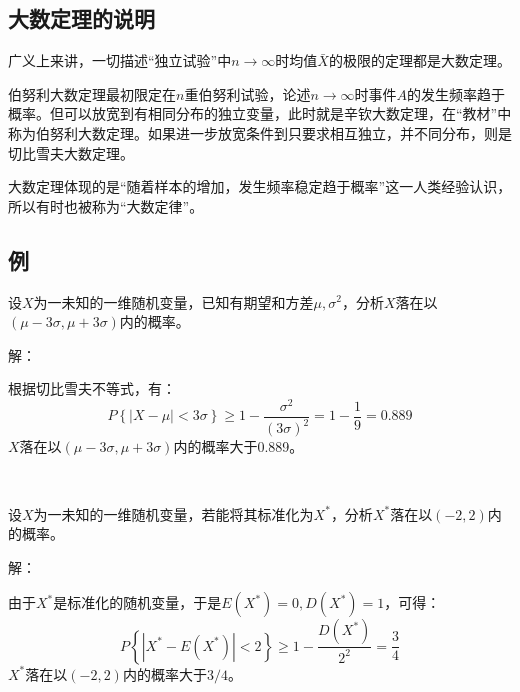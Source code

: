 \subsection{大数定理的说明}

广义上来讲，一切描述“独立试验”中$n\rightarrow \infty $时均值$\bar{X}$的极限的定理都是大数定理。

伯努利大数定理最初限定在$n$重伯努利试验，论述$n\rightarrow \infty $时事件$A$的发生频率趋于概率。但可以放宽到有相同分布的独立变量，此时就是辛钦大数定理，在“教材\cite{book2}”中称为伯努利大数定理。如果进一步放宽条件到只要求相互独立，并不同分布，则是切比雪夫大数定理。

大数定理体现的是“随着样本的增加，发生频率稳定趋于概率”这一人类经验认识，所以有时也被称为“大数定律”。

\subsection{例}

\begin{example}
设$X$为一未知的一维随机变量，已知有期望和方差$\mu ,\sigma ^2$，分析$X$落在以$\left( \mu -3\sigma ,\mu +3\sigma \right) $内的概率。
\end{example}

解：

根据切比雪夫不等式，有：
\[
P\left\{ \left| X-\mu \right|<3\sigma \right\} \geqslant 1-\frac{\sigma ^2}{\left( 3\sigma \right) ^2}=1-\frac{1}{9}=0.889
\]
$X$落在以$\left( \mu -3\sigma ,\mu +3\sigma \right) $内的概率大于0.889。

~

\begin{example}
设$X$为一未知的一维随机变量，若能将其标准化为$X^*$，分析$X^*$落在以$\left( -2,2 \right) $内的概率。
\end{example}

解：

由于$X^*$是标准化的随机变量，于是$E\left( X^* \right) =0,D\left( X^* \right) =1$，可得：
\[
P\left\{ \left| X^*-E\left( X^* \right) \right|<2 \right\} \geqslant 1-\frac{D\left( X^* \right)}{2^2}=\frac{3}{4}
\]
$X^*$落在以$\left( -2,2 \right) $内的概率大于$3/4$。




